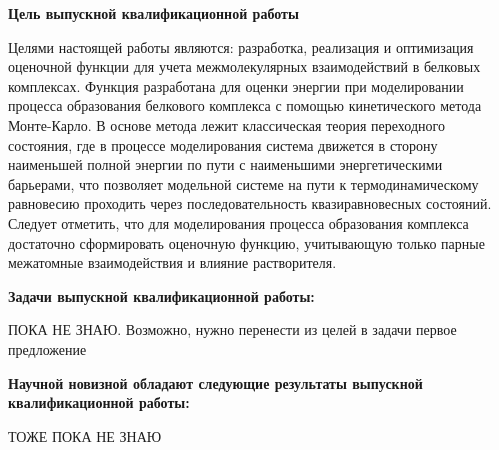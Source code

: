 \textbf{Цель выпускной квалификационной работы} 

Целями настоящей работы являются: разработка, реализация и оптимизация оценочной функции для учета межмолекулярных взаимодействий в белковых комплексах. Функция разработана для оценки энергии при моделировании процесса образования белкового комплекса с помощью кинетического метода Монте-Карло. В основе метода лежит классическая теория переходного состояния, где в процессе моделирования система движется в сторону наименьшей полной энергии по пути с наименьшими энергетическими барьерами, что позволяет модельной системе на пути к термодинамическому равновесию проходить через последовательность квазиравновесных состояний. Следует отметить, что для моделирования процесса образования комплекса достаточно сформировать оценочную функцию, учитывающую только парные межатомные взаимодействия и влияние растворителя. 

\textbf{Задачи выпускной квалификационной работы:}

ПОКА НЕ ЗНАЮ. Возможно, нужно перенести из целей в задачи первое предложение

\textbf{Научной новизной обладают следующие результаты выпускной
  квалификационной работы:}

ТОЖЕ ПОКА НЕ ЗНАЮ
